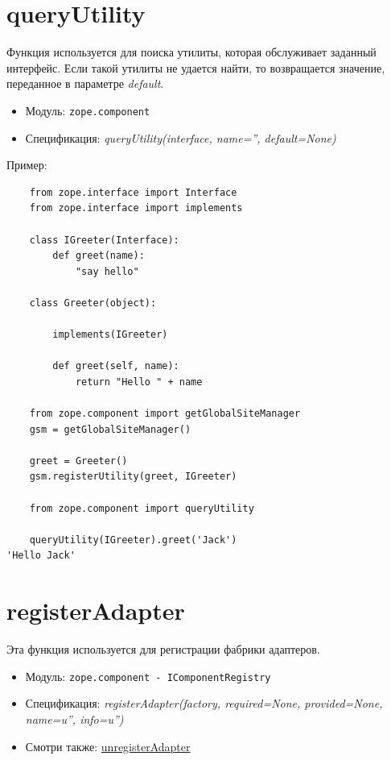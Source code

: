 \documentclass[a4paper,openany,twoside,final]{book}
\providecommand*{\DUroletitlereference}[1]{\textsl{#1}}
\begin{document}
\section*{queryUtility%
  \label{queryutility}%
}

Функция используется для поиска утилиты, которая обслуживает заданный интерфейс.  Если такой утилиты не удается найти, то возвращается значение, переданное в параметре \DUroletitlereference{default}.

\begin{itemize}

\item Модуль: \texttt{zope.component}

\item Спецификация: \DUroletitlereference{queryUtility(interface, name='', default=None)}

\end{itemize}

Пример:

\begin{verbatim}
    from zope.interface import Interface
    from zope.interface import implements

    class IGreeter(Interface):
        def greet(name):
            "say hello"

    class Greeter(object):

        implements(IGreeter)

        def greet(self, name):
            return "Hello " + name

    from zope.component import getGlobalSiteManager
    gsm = getGlobalSiteManager()

    greet = Greeter()
    gsm.registerUtility(greet, IGreeter)

    from zope.component import queryUtility

    queryUtility(IGreeter).greet('Jack')
'Hello Jack'
\end{verbatim}


\section*{registerAdapter%
  \label{registeradapter}%
}

Эта функция используется для регистрации фабрики адаптеров.

\begin{itemize}

\item Модуль: \texttt{zope.component - IComponentRegistry}

\item Спецификация: \DUroletitlereference{registerAdapter(factory, required=None, provided=None, name=u'', info=u'')}

\item Смотри также: \hyperref[unregisteradapter]{unregisterAdapter}

\end{itemize}
\end{document}
